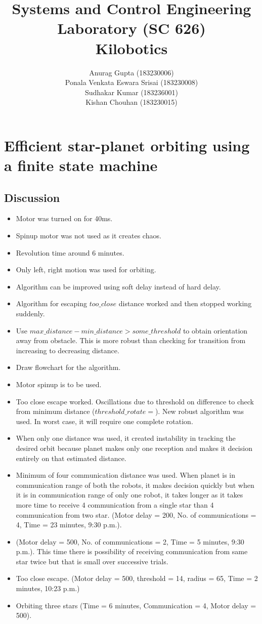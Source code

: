 \documentclass{report}[12pt]
\author{Anurag Gupta (183230006) \\ Ponala Venkata Eswara Srisai
(183230008)\\ Sudhakar Kumar (183236001)\\ Kishan Chouhan (183230015)}
\title{Systems and Control Engineering Laboratory (SC 626) \\ Kilobotics}
\begin{document}
\maketitle
\tableofcontents
\thispagestyle{empty}
\mbox{}
%

\chapter{Efficient star-planet orbiting using a finite state machine}
\section{Discussion}
\begin{itemize}
    \item Motor was turned on for 40ms.
    \item Spinup motor was not used as it creates chaos.
    \item Revolution time around 6 minutes.
    \item Only left, right motion was used for orbiting.
    \item Algorithm can be improved using soft delay instead of hard delay.
    \item Algorithm for escaping $too\_close$ distance worked and then stopped working suddenly.
    \item Use $max\_distance-min\_distance>some\_threshold$ to obtain orientation away from obstacle. This is more robust than checking for transition from increasing to decreasing distance.
    \item Draw flowchart for the algorithm.
    \item Motor spinup is to be used.
    \item Too close escape worked. Oscillations due to threshold on difference to check from minimum distance ($threshold\_rotate = $). New robust algorithm was used. In worst case, it will require one complete rotation.
    \item When only one distance was used, it created instability in tracking the desired orbit because planet makes only one reception and makes it decision entirely on that estimated distance.
    \item Minimum of four communication distance was used. When planet is in communication range of both the robots, it makes decision quickly but when it is in communication range of only one robot, it takes longer as it takes more time to receive 4 communication from a single star than 4 communication from two star. (Motor delay = 200, No. of communications = 4, Time = 23 minutes, 9:30 p.m.).
    \item (Motor delay = 500, No. of communications = 2, Time = 5 minutes, 9:30 p.m.). This time there is possibility of receiving communication from same star twice but that is small over successive trials.
    \item Too close escape. (Motor delay = 500, threshold = 14, radius = 65, Time = 2 minutes, 10:23 p.m.)
    \item Orbiting three stars (Time = 6 minutes, Communication = 4, Motor delay = 500).
\end{itemize}
\end{document}
